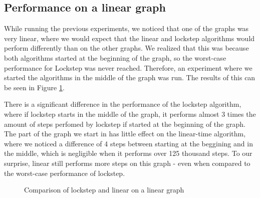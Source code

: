 \documentclass[../master/master.tex]{subfiles}
\begin{document}
\subsection{Performance on a linear graph}
While running the previous experiments, we noticed that one of the graphs was very linear, where we would expect that the linear and lockstep algorithms would perform differently than on the other graphs. We realized that this was because both algorithms started at the beginning of the graph, so the worst-case performance for Lockstep was never reached. Therefore, an experiment where we started the algorithms in the middle of the graph was run. The results of this can be seen in Figure \ref{barchart}.

There is a significant difference in the performance of the lockstep algorithm, where if lockstep starts in the middle of the graph, it performs almost 3 times the amount of steps perfomed by lockstep if started at the beginning of the graph. The part of the graph we start in has little effect on the linear-time algorithm, where we noticed a difference of 4 steps between starting at the beggining and in the middle, which is negligible when it performs over 125 thousand steps. To our surprise, linear still performs more steps on this graph - even when compared to the worst-case performance of lockstep.
\begin{figure}
\centering
{}
\caption{Comparison of lockstep and linear on a linear graph}\label{barchart}
\end{figure}
\end{document}
